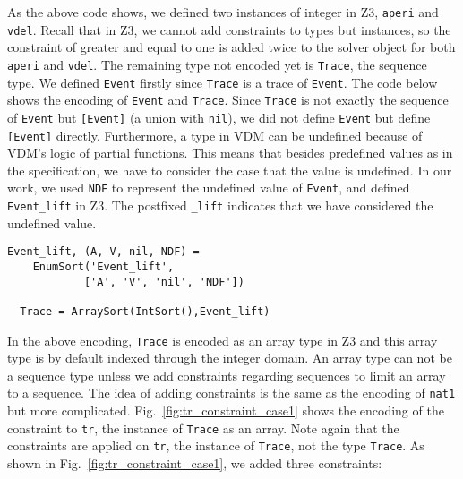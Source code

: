 As the above code shows, we defined two instances of integer in Z3, {\tt aperi} and {\tt vdel}. Recall that in Z3, we cannot add constraints to types but instances, so the constraint of greater and equal to one is added twice to the solver object for both {\tt aperi} and {\tt vdel}. The remaining type not encoded yet is {\tt Trace}, the sequence type. We defined {\tt Event} firstly since {\tt Trace} is a trace of {\tt Event}. The code below shows the encoding of {\tt Event} and {\tt Trace}. Since {\tt Trace} is not exactly the sequence of {\tt Event} but {\tt [Event]} (a union with {\tt nil}), we did not define {\tt Event} but define {\tt [Event]} directly. Furthermore, a type in VDM can be undefined because of VDM's logic of partial functions. This means that besides predefined values as in the specification, we have to consider the case that the value is undefined. In our work, we used {\tt NDF} to represent the undefined value of {\tt Event}, and defined {\tt Event\_lift} in Z3. The postfixed {\tt \_lift} indicates that we have considered the undefined value.

\begin{mdframed}[roundcorner=5pt,shadow=true]
\begin{Verbatim}[fontsize=\small]
  Event_lift, (A, V, nil, NDF) = 
    EnumSort('Event_lift', 
            ['A', 'V', 'nil', 'NDF'])

  Trace = ArraySort(IntSort(),Event_lift)
\end{Verbatim}
\end{mdframed}

In the above encoding, {\tt Trace} is encoded as an array type in Z3 and this array type is by default indexed through the integer domain. An array type can not be a sequence type unless we add constraints regarding sequences to limit an array to a sequence. The idea of adding constraints is the same as the encoding of {\tt nat1} but more complicated. Fig.~\ref{fig:tr_constraint_case1} shows the encoding of the constraint to {\tt tr}, the instance of {\tt Trace} as an array. Note again that the constraints are applied on {\tt tr}, the instance of {\tt Trace}, not the type {\tt Trace}. As shown in Fig.~\ref{fig:tr_constraint_case1}, we added three constraints: 

